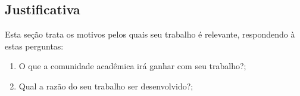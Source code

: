 

\subsection{\textbf{Justificativa}}
    \label{sec:justificativa}
    
    Esta seção trata os motivos pelos quais seu trabalho é relevante, respondendo à estas perguntas:
    \begin{enumerate}
        \item O que a comunidade acadêmica irá ganhar com seu trabalho?;
        \item Qual a razão do seu trabalho ser desenvolvido?;
    \end{enumerate}
    